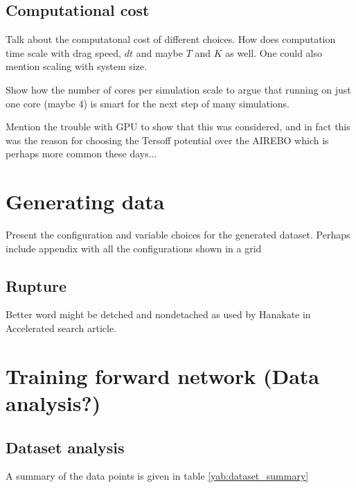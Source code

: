 \section{Computational cost}

Talk about the computatonal cost of different choices. How does computation time scale with drag speed, $dt$ and maybe $T$ and $K$ as well. One could also mention scaling with system size.

Show how the number of cores per simulation scale to argue that running on just one core (maybe 4) is smart for the next step of many simulations. 

Mention the trouble with GPU to show that this was considered, and in fact this was the reason for choosing the Tersoff potential over the AIREBO which is perhaps more common these days...



\chapter{Generating data}

Present the configuration and variable choices for the generated dataset. Perhaps include appendix with all the configurations shown in a grid


\section{Rupture}
Better word might be detched and nondetached as used by Hanakate in Accelerated search article.

\chapter{Training forward network (Data analysis?)}

\section{Dataset analysis}

A summary of the data points is given in table \ref{yab:dataset_summary}

